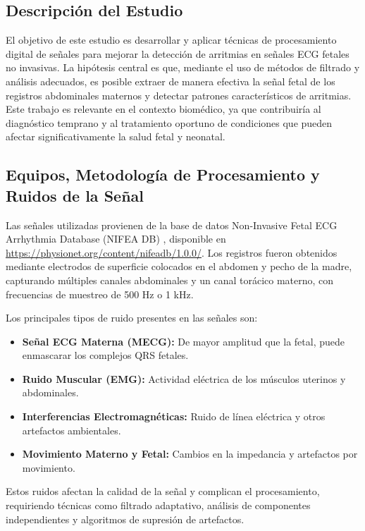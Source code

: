 \documentclass[10pt, conference]{IEEEtran}
\begin{document}
\subsection{Descripción del Estudio}

El objetivo de este estudio es desarrollar y aplicar técnicas de procesamiento digital de señales para mejorar la detección de arritmias en señales ECG fetales no invasivas. La hipótesis central es que, mediante el uso de métodos de filtrado y análisis adecuados, es posible extraer de manera efectiva la señal fetal de los registros abdominales maternos y detectar patrones característicos de arritmias. Este trabajo es relevante en el contexto biomédico, ya que contribuiría al diagnóstico temprano y al tratamiento oportuno de condiciones que pueden afectar significativamente la salud fetal y neonatal.

\subsection{Equipos, Metodología de Procesamiento y Ruidos de la Señal}

Las señales utilizadas provienen de la base de datos Non-Invasive Fetal ECG Arrhythmia Database (NIFEA DB) \cite{behar2019noninvasive}, disponible en \url{https://physionet.org/content/nifeadb/1.0.0/}. Los registros fueron obtenidos mediante electrodos de superficie colocados en el abdomen y pecho de la madre, capturando múltiples canales abdominales y un canal torácico materno, con frecuencias de muestreo de 500 Hz o 1 kHz.

Los principales tipos de ruido presentes en las señales son:

\begin{itemize}
	\item \textbf{Señal ECG Materna (MECG):} De mayor amplitud que la fetal, puede enmascarar los complejos QRS fetales.
	\item \textbf{Ruido Muscular (EMG):} Actividad eléctrica de los músculos uterinos y abdominales.
	\item \textbf{Interferencias Electromagnéticas:} Ruido de línea eléctrica y otros artefactos ambientales.
	\item \textbf{Movimiento Materno y Fetal:} Cambios en la impedancia y artefactos por movimiento.
\end{itemize}

Estos ruidos afectan la calidad de la señal y complican el procesamiento, requiriendo técnicas como filtrado adaptativo, análisis de componentes independientes y algoritmos de supresión de artefactos.
\end{document}
